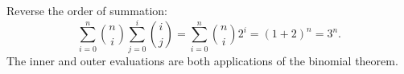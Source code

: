 Reverse the order of summation:
\[
\sum_{i=0}^n\binom ni\sum_{j=0}^i\binom ij
=\sum_{i=0}^n\binom ni2^i
=(1+2)^n=\boxed{3^n}.
\]
The inner and outer evaluations are both applications of the binomial theorem.
